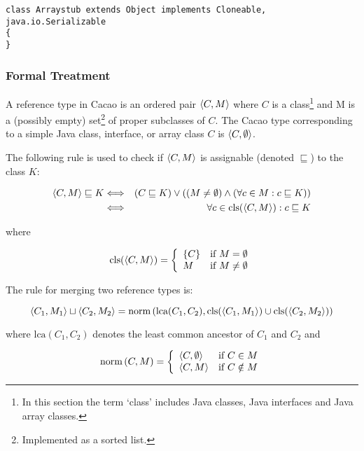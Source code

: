 \begin{verbatim}
class Arraystub extends Object implements Cloneable, java.io.Serializable
{
}
\end{verbatim}

\subsubsection{Formal Treatment}

\begin{definition} 
A reference type in Cacao is an ordered pair $\langle C, M\rangle$ where $C$
is a class\footnote{In this section the term `class' includes Java
classes, Java interfaces and Java array classes.} and M is a (possibly
empty) set\footnote{Implemented as a sorted list.} of proper
subclasses of $C$. The Cacao type corresponding to a simple Java
class, interface, or array class $C$ is $\langle C, \emptyset\rangle$.  
\end{definition}

The following rule is used to check if $\langle C, M\rangle$ is assignable
(denoted $\sqsubseteq$) to the class $K$:

\begin{eqnarray*}
\langle C, M\rangle\sqsubseteq K 
& \Longleftrightarrow &
(C\sqsubseteq K) \vee ((M \neq \emptyset) \wedge
(\forall c \in M: c\sqsubseteq K)) \\
& \Longleftrightarrow &
\forall c \in \textrm{cls}(\langle C, M\rangle): c\sqsubseteq K
\end{eqnarray*}

where

\[\textrm{cls}(\langle C, M\rangle) = 
\left\{ \begin{array}{ll} \{C\} & \mbox{if $M = \emptyset$} \\
                         M     & \mbox{if $M \neq \emptyset$}
       \end{array}
\right.\]

The rule for merging two reference types is:

\[\langle C_1, M_1\rangle \sqcup \langle C_2, M_2\rangle = 
\textrm{norm}\left(\textrm{lca}(C_1,C_2),\textrm{cls}(\langle C_1, M_1\rangle) \cup \textrm{cls}(\langle C_2, M_2\rangle)\right)\]

where $\textrm{lca}(C_1,C_2)$ denotes the least common ancestor of
$C_1$ and $C_2$ and

\[\textrm{norm}\left(C,M\right) = 
\left\{ \begin{array}{ll} \langle C, \emptyset\rangle & \mbox{if $C \in M$} \\
                          \langle C, M\rangle         & \mbox{if $C \notin M$}
       \end{array}
\right.\]

